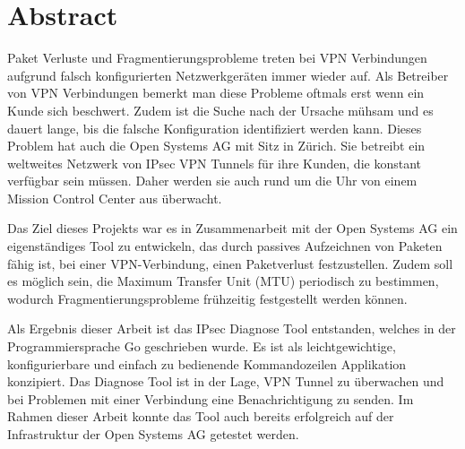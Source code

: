 
\chapter*{Abstract}

Paket Verluste und Fragmentierungsprobleme treten bei VPN Verbindungen aufgrund falsch konfigurierten Netzwerkgeräten immer wieder auf. Als Betreiber von VPN Verbindungen bemerkt man diese Probleme oftmals erst wenn ein Kunde sich beschwert. Zudem ist die Suche nach der Ursache mühsam und es dauert lange, bis die falsche Konfiguration identifiziert werden kann.
Dieses Problem hat auch die Open Systems AG mit Sitz in Zürich. Sie betreibt ein weltweites Netzwerk von IPsec VPN Tunnels für ihre Kunden, die konstant verfügbar sein müssen. Daher werden sie auch rund um die Uhr von einem Mission Control Center aus überwacht.

Das Ziel dieses Projekts war es in Zusammenarbeit mit der Open Systems AG ein eigenständiges Tool zu entwickeln, das durch passives Aufzeichnen von Paketen fähig ist, bei einer VPN-Verbindung, einen Paketverlust festzustellen.
Zudem soll es möglich sein, die Maximum Transfer Unit (MTU) periodisch zu bestimmen, wodurch Fragmentierungsprobleme frühzeitig festgestellt werden können.

Als Ergebnis dieser Arbeit ist das IPsec Diagnose Tool entstanden, welches in der Programmiersprache Go geschrieben wurde. Es ist als leichtgewichtige, konfigurierbare und einfach zu bedienende Kommandozeilen Applikation konzipiert. Das Diagnose Tool ist in der Lage, VPN Tunnel zu überwachen und bei Problemen mit einer Verbindung eine Benachrichtigung zu senden. Im Rahmen dieser Arbeit konnte das Tool auch bereits erfolgreich auf der Infrastruktur der Open Systems AG getestet werden.